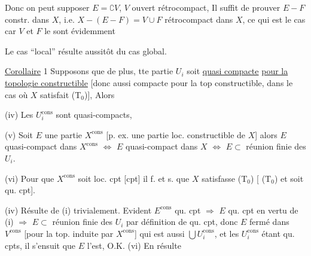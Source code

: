 Donc on peut supposer $E=\complement V$, $V$  ouvert rétrocompact,  Il suffit de prouver  $E-F$ constr. dans $X$, i.e. $X-(E-F)=V\cup F$ rétrocompact dans $X$, ce qui est le cas car $V$ et $F$ le sont évidemment \unsure{\ldots}


Le cas ``local'' résulte aussitôt du cas global.

\uline{Corollaire} 1 Supposons que de plus, tte partie $U_i$ soit \uline{quasi compacte} \deleted{\unsure{[alors ce}} \uline{pour la topologie constructible} [donc aussi  compacte pour la top constructible, dans le cas où  $X$ satisfait (T$_0$)],  Alors


(iv) Les $U_i^{\mathrm{cons}}$ sont quasi-compacts, 

(v) Soit $E$ une partie   $X^{\mathrm{cons}}$ [p. ex. une partie loc. constructible \deleted{\unsure{]}} de $X$] alors $E$  quasi-compact  dans $X^{\mathrm{cons}}$ $\Longleftrightarrow$ $E$ quasi-compact dans $X$ $\Longleftrightarrow$ $E\subset$ réunion finie des $U_i$.

(vi) Pour que $X^{\mathrm{cons}}$ soit loc. cpt [cpt] il f. et s. que $X$ satisfasse (T$_0$) [ (T$_0$) et soit qu. cpt].

(iv) Résulte de (i) trivialement. Evident $E^{\mathrm{cons}}$ qu. cpt $\Rightarrow$ $E$ qu. cpt en vertu de (i) $\Rightarrow$ $E\subset$ réunion finie  des $U_i$ par définition de qu. cpt, donc $E$ fermé dans $V^{\mathrm{cons}}$ [pour la top. induite par $X^{\mathrm{cons}}$] qui est aussi $\bigcup U_i^{\mathrm{cons}}$, et les $U_i^{\mathrm{cons}}$ étant qu. cpts, il s'ensuit que $E$ l'est, O.K. \quad (vi) En résulte 
